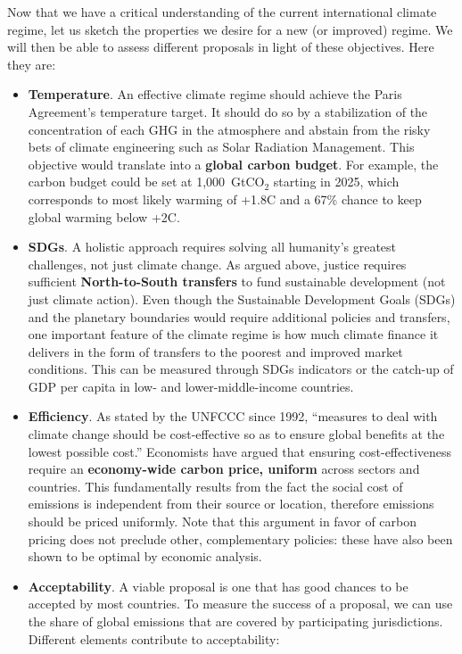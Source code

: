 \documentclass[12pt,english]{article}
\newcommand{\bo}[1]{\textbf{#1}}
\begin{document}
Now that we have a critical understanding of the current international climate regime, let us sketch the properties we desire for a new (or improved) regime. We will then be able to assess different proposals in light of these objectives. Here they are:
\begin{itemize}
  \item \bo{Temperature}. An effective climate regime should achieve the Paris Agreement's temperature target. It should do so by a stabilization of the concentration of each GHG in the atmosphere and abstain from the risky bets of climate engineering such as Solar Radiation Management. This objective would translate into a \textbf{global carbon budget}. For example, the carbon budget could be set at 1,000~GtCO$_\text{2}$ starting in 2025, which corresponds to most likely warming of +1.8\textdegree{}C and a 67\% chance to keep global warming below +2\textdegree{}C. 
  \item \bo{SDGs}. A holistic approach requires solving all humanity's greatest challenges, not just climate change. As argued above, justice requires sufficient \textbf{North-to-South transfers} to fund sustainable development (not just climate action). Even though the Sustainable Development Goals (SDGs) and the planetary boundaries would require additional policies and transfers, one important feature of the climate regime is how much climate finance it delivers in the form of transfers to the poorest and improved market conditions. This can be measured through SDGs indicators or the catch-up of GDP per capita in low- and lower-middle-income countries.
  \item \bo{Efficiency}. As stated by the UNFCCC since 1992,\cite{unfccc_united_1992-1} ``measures to deal with climate change should be cost-effective so as to ensure global benefits at the lowest possible cost.'' Economists have argued that ensuring cost-effectiveness require an \textbf{economy-wide carbon price, uniform} across sectors and countries. This fundamentally results from the fact the social cost of emissions is independent from their source or location, therefore emissions should be priced uniformly. %
  Note that this argument in favor of carbon pricing does not preclude other, complementary policies: these have also been shown to be optimal by economic analysis.\cite{stiglitz_addressing_2019}
  \item \bo{Acceptability}. A viable proposal is one that has good chances to be accepted by most countries. To measure the success of a proposal, we can use the share of global emissions that are covered by participating jurisdictions. Different elements contribute to acceptability: 

\end{itemize}
\end{document}
